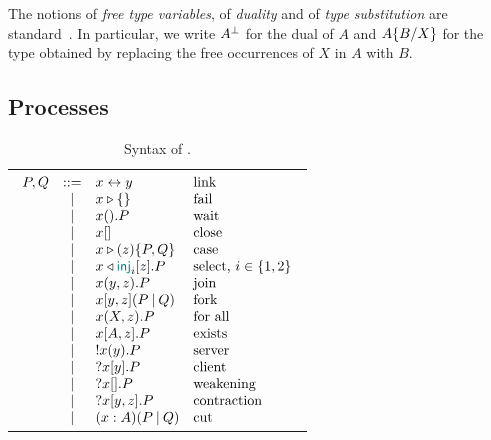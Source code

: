 The notions of \emph{free type variables}, of \emph{duality} and of \emph{type
substitution} are standard~\cite{Wadler14}. In particular, we write $A^{\bot}$
for the dual of $A$ and $A\{B/X\}$ for the type obtained by replacing the
free occurrences of $X$ in $A$ with $B$.

\subsection{Processes}
\label{sec:syntax}

\begin{table}[t]
    \caption{Syntax of \Calculus.}\label{tab:syntax}
    \begin{tabular}{c}
        \begin{math}
            \displaystyle
            \begin{array}[t]{rcll}
                P, Q & ::= & \Link\x\y            & \text{link} \\
                    & | & \Fail\x                 & \text{fail} \\
                    & | & \Wait\x.P               & \text{wait} \\
                    & | & \Close\x                & \text{close} \\
                    & | & \Case\x\z{P}{Q}         & \text{case} \\
                    & | & \Select\x{\InTag_i}\z.P & \text{select, $i\in\set{1,2}$} \\
                    & | & \Join\x\y\z.P           & \text{join} \\
                    & | & \Fork\x\y\z{P}{Q}       & \text{fork} \\
                    & | & \Forall\x\X\z.P         & \text{for all} \\
                    & | & \Exists\x{A}\z.P        & \text{exists} \\
                    & | & \Server\x\y.P           & \text{server} \\
                    & | & \Client\x\y.P           & \text{client} \\
                    & | & \Weaken\x.P             & \text{weakening} \\
                    & | & \Contract\x\y\z.P       & \text{contraction} \\
                    & | & \Cut[A]\x{P}{Q}         & \text{cut} \\
            \end{array}
        \end{math}
    \end{tabular}
\end{table}

